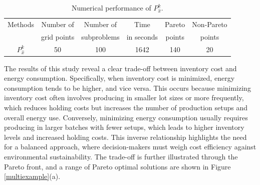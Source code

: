 \documentclass[11pt]{article}
\begin{document}
\begin{table}[H]
\small
\caption{Numerical performance of $P_{\hat{x}}^k$.}  
\centering 
\begin{tabular}{||c| c| c| c| c| c||} %
\hline \hline %
Methods &   Number of  & Number of   & Time          & Pareto    & Non-Pareto  \\  %
       &   grid points     & subproblems & in seconds    & points    &   points \\ [0.5ex] %
\hline %
$P_{\hat{x}}^k$ & 50       & 100       & 1642       & 140        & 20          \\ 
\hline
\hline %
\end{tabular}
\label{tablemop2} %
\end{table}
\noindent The results of this study reveal a clear trade-off between inventory cost and energy consumption. Specifically, when inventory cost is minimized, energy consumption tends to be higher, and vice versa. This occurs because minimizing inventory cost often involves producing in smaller lot sizes or more frequently, which reduces holding costs but increases the number of production setups and overall energy use. Conversely, minimizing energy consumption usually requires producing in larger batches with fewer setups, which leads to higher inventory levels and increased holding costs. This inverse relationship highlights the need for a balanced approach, where decision-makers must weigh cost efficiency against environmental sustainability. The trade-off is further illustrated through the Pareto front, and a range of Pareto optimal solutions are shown in Figure \ref{multiexample}(a).
\end{document}
